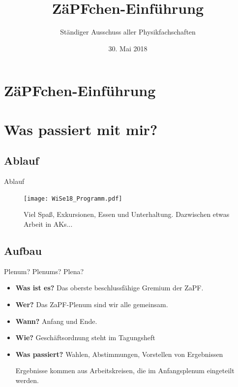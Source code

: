 \documentclass[compress,]{beamer}
\title[ZäPFchen-Einführung]{ZäPFchen-Einführung}
\author{Ständiger Ausschuss aller Physikfachschaften}
\institute[Zusammenkunft aller Physikfachschaften]
\date{30. Mai 2018}
\begin{document}
\begin{frame}
  \titlepage

\end{frame}

\section{ZäPFchen-Einführung}



\section{Was passiert mit mir?}

\subsection{Ablauf}

\begin{frame}{Ablauf}

  \begin{figure}
    \centering
    \texttt{[image: WiSe18\_Programm.pdf]}

    \caption{Viel Spaß, Exkursionen, Essen und Unterhaltung. Dazwischen etwas Arbeit in AKs...}
  \end{figure}

\end{frame}


\subsection{Aufbau}

\begin{frame}{Plenum? Plenums? Plena?}

  \begin{itemize}[<+->]
  \item \textbf{Was ist es?} Das oberste beschlussfähige Gremium der ZaPF.
  \item \textbf{Wer?} Das ZaPF-Plenum sind wir alle gemeinsam.
  \item \textbf{Wann?} Anfang und Ende.
  \item \textbf{Wie?} Geschäftsordnung steht im Tagungsheft
  \item \textbf{Was passiert?} Wahlen, Abstimmungen, Vorstellen von Ergebnissen

    Ergebnisse kommen aus Arbeitskreisen, die im Anfangsplenum eingeteilt werden.
  \end{itemize}


\end{frame}
\end{document}
